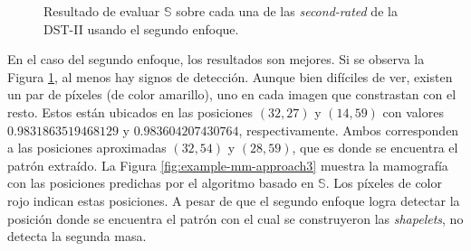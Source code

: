 \begin{figure}
	\caption{Resultado de evaluar $\mathbb{S}$ sobre cada una de las \textit{second-rated} de la DST-II usando el segundo enfoque.} \label{fig:example-mm-approach2}
\end{figure}

En el caso del segundo enfoque, los resultados son mejores. Si se observa la Figura \ref{fig:example-mm-approach2}, al menos hay signos de detección.
Aunque bien difíciles de ver, existen un par de píxeles (de color amarillo), uno en cada imagen que constrastan con el resto.
Estos están ubicados en las posiciones $(32,27)$ y $(14,59)$ con valores $0.9831863519468129$ y $0.983604207430764$,
respectivamente. Ambos corresponden a las posiciones aproximadas $(32,54)$ y $(28,59)$, que es donde se encuentra el patrón extraído.
La Figura \ref{fig:example-mm-approach3} muestra la mamografía con las posiciones 
predichas por el algoritmo basado en $\mathbb{S}$. Los píxeles de color rojo indican estas posiciones.
A pesar de que el segundo enfoque logra detectar la posición donde se encuentra el patrón con el cual se construyeron
las \textit{shapelets}, no detecta la segunda masa.

